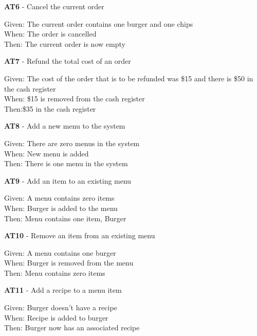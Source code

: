 \linebreak
\textbf{AT6} - Cancel the current order\\
\begin{small}
Given: The current order contains one burger and one chips\\
When: The order is cancelled\\
Then: The current order is now empty\\
\end{small}
\linebreak
\textbf{AT7} - Refund the total cost of an order\\
\begin{small}
Given: The cost of the order that is to be refunded was \$15 and there is \$50 in the cash register\\
When: \$15 is removed from the cash register\\
Then:\$35 in the cash register\\
\end{small}
\linebreak
\textbf{AT8} - Add a new menu to the system\\
\begin{small}
Given: There are zero menus in the system\\
When: New menu is added\\
Then: There is one menu in the system\\
\end{small}
\linebreak
\textbf{AT9} - Add an item to an existing menu\\
\begin{small}
Given: A menu contains zero items\\
When: Burger is added to the menu\\
Then: Menu contains one item, Burger\\
\end{small}
\linebreak
\textbf{AT10} - Remove an item from an existing menu\\
\begin{small}
Given: A menu contains one burger\\
When: Burger is removed from the menu\\
Then: Menu contains zero items\\
\end{small}
\linebreak
\textbf{AT11} - Add a recipe to a menu item\\
\begin{small}
Given: Burger doesn't have a recipe\\
When: Recipe is added to burger\\
Then: Burger now has an associated recipe\\
\end{small}
\pagebreak


